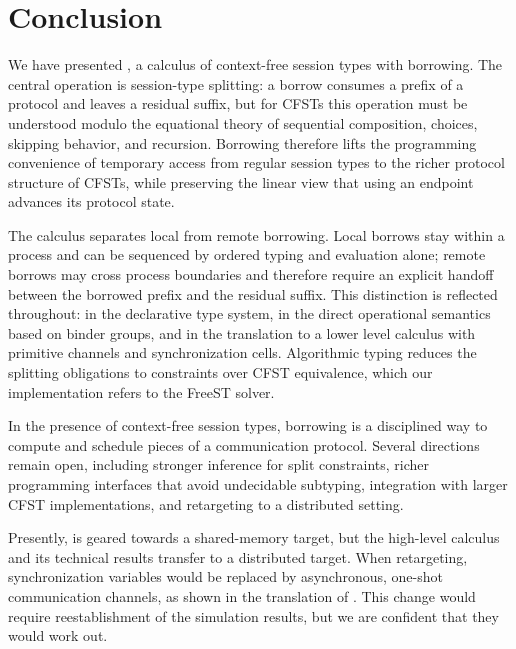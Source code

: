 
\section{Conclusion}
\label{sec:conclusion}

We have presented \thecalculus, a calculus of context-free session
types with borrowing.  The central operation is session-type
splitting: a borrow consumes a prefix of a protocol and leaves a
residual suffix, but for CFSTs this operation must be understood
modulo the equational theory of sequential composition, choices,
skipping behavior, and recursion.  Borrowing therefore lifts the
programming convenience of temporary access from regular session types
to the richer protocol structure of CFSTs, while preserving the
linear view that using an endpoint advances its protocol state.

The calculus separates local from remote borrowing.  Local borrows
stay within a process and can be sequenced by ordered typing and
evaluation alone; remote borrows may cross process boundaries and
therefore require an explicit handoff between the borrowed prefix and
the residual suffix.  This distinction is reflected throughout: in the declarative type system, in the direct operational 
semantics based on binder groups, and in the translation to a lower
level calculus \thertcalculus with primitive channels and synchronization cells.  
Algorithmic typing reduces the splitting obligations to
constraints over CFST equivalence, which our implementation
refers to the FreeST solver.

In the presence of context-free
session types,  borrowing is a disciplined way to compute and schedule pieces
of a communication protocol.  Several directions remain open,
including stronger inference for split constraints, richer programming
interfaces that avoid undecidable subtyping, integration with
larger CFST implementations, and retargeting \thertcalculus to a distributed setting.

Presently, \thertcalculus is geared towards a shared-memory target, but the high-level
calculus and its technical results transfer to a distributed target. When
retargeting, synchronization variables would be replaced by asynchronous, 
one-shot communication channels, as shown in the translation of
\citet{DBLP:journals/pacmpl/SaffrichS0V25}. This change would require
reestablishment of the simulation results, but we are confident that they would
work out.


